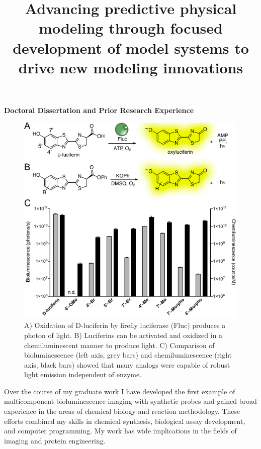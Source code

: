 \documentclass[11pt]{article}
\title{ Advancing predictive physical modeling through focused development of model systems to drive new modeling innovations}
\begin{document}
\textbf{Doctoral Dissertation and Prior Research Experience}\\
\begin{figure}
\vspace{-0.2in}
\begin{centering}
\includegraphics[width=\textwidth]{figures/chemilum.pdf}

\end{centering}
\footnotesize
\caption{\label{figure:chemilum}
A) Oxidation of D-luciferin by firefly luciferase (Fluc) produces a photon of light. B) Luciferins can be activated and oxidized in a chemiluminescent manner to produce light. C) Comparison of bioluminescence (left axis, grey bars) and chemiluminescence (right axis, black bars) showed that many analogs were capable of robust light emission independent of enzyme.}
\end{figure}
Over the course of my graduate work I have developed the first example of multicomponent bioluminescence imaging with synthetic probes and gained broad experience in the areas of chemical biology and reaction methodology. These efforts combined my skills in chemical synthesis, biological assay development, and computer programming. My work has wide implications in the fields of imaging and protein engineering.
\end{document}
